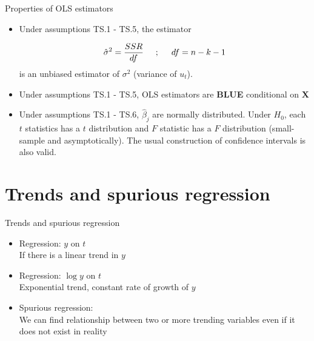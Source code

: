 \documentclass{beamer}
\begin{document}

\begin{frame}{Properties of OLS estimators}
\begin{itemize}
\item Under assumptions TS.1 - TS.5, the estimator 

$$\hat{\sigma}^2=\frac{SSR}{df} \hspace{0.5cm} ; \hspace{0.5cm} df=n-k-1 $$   
is an unbiased estimator of $\sigma^2$ (variance of $u_t$).

\vspace{0.5cm}

\item Under assumptions TS.1 - TS.5, OLS estimators are \textbf{BLUE} conditional on $\boldsymbol{X}$

\vspace{0.5cm}

\item Under assumptions TS.1 - TS.6, $\hat{\beta}_j$ are normally distributed. Under $H_0$, each $t$ statistics has a $t$ distribution and $F$ statistic has a $F$ distribution (small-sample and asymptotically). The usual construction of confidence intervals is also valid. 
\end{itemize}
\end{frame}


\section{Trends and spurious regression}

\begin{frame}{Trends and spurious regression}
\begin{itemize}
\item Regression: $y$ on $t$ \\ If there is a linear trend in $y$
\vspace{0.5cm}
\item Regression: $\log{y}$ on $t$ \\ Exponential trend, constant rate of growth of $y$
\vspace{0.5cm}
\item Spurious regression: \\ We can find relationship between two or more trending variables even if it does not exist in reality
\end{itemize}
\end{frame}
\end{document}
